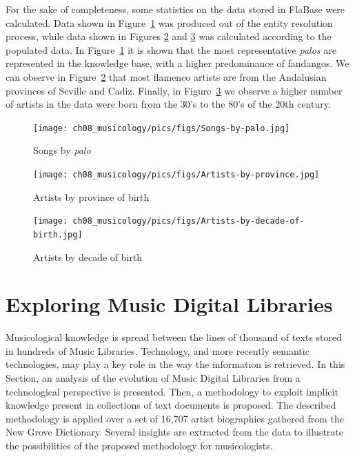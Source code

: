 For the sake of completeness, some statistics on the data stored in FlaBase were calculated. 
 Data shown in Figure~\ref{fig:graph-palo} was produced out of the entity resolution process, while data shown in Figures \ref{fig:graph-province} and \ref{fig:graph-decade} was calculated according to the populated data. In Figure~\ref{fig:graph-palo} it is shown that the most representative {\it palos} are represented in the knowledge base, with a higher predominance of fandangos. We can observe in Figure~\ref{fig:graph-province} that most flamenco artists are from the Andalusian provinces of Seville and Cadiz. 
Finally, in Figure~\ref{fig:graph-decade} we observe a higher number of artists in the data were born from the 30's to the 80's of the 20th century.



\begin{figure}[!ht]
    \centering
    \texttt{[image: ch08\_musicology/pics/figs/Songs-by-palo.jpg]}
    \caption{Songs by {\it palo} 
    \label{fig:graph-palo}}
\end{figure}


\begin{figure}[!ht]
	\centering
	\texttt{[image: ch08\_musicology/pics/figs/Artists-by-province.jpg]}
	\caption{Artists by province of birth 
	\label{fig:graph-province}}
\end{figure}


\begin{figure}[!ht]
	\centering
	\texttt{[image: ch08\_musicology/pics/figs/Artists-by-decade-of-birth.jpg]}
	\caption{Artists by decade of birth 
	\label{fig:graph-decade}}
\end{figure}


\section{Exploring Music Digital Libraries}

Musicological knowledge is spread between the lines of thousand of texts stored in hundreds of Music Libraries. Technology, and more recently semantic technologies, may play a key role in the way the information is retrieved. In this Section, an analysis of the evolution of Music Digital Libraries from a technological perspective is presented. Then, a methodology to exploit implicit knowledge present in collections of text documents is proposed. The described methodology is applied over a set of 16,707 artist biographies gathered from the New Grove Dictionary. %
Several insights are extracted from the data to illustrate the possibilities of the proposed methodology for musicologists.

